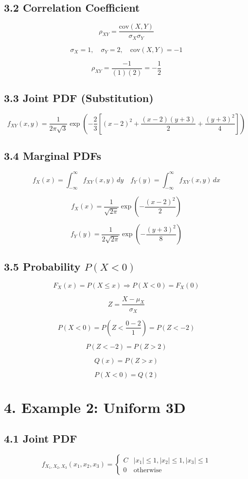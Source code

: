 \documentclass[12pt]{article}
\begin{document}
\subsection*{3.2 Correlation Coefficient}
\[
\rho_{XY} = \frac{\text{cov}(X,Y)}{\sigma_X \sigma_Y}
\]

\[
\sigma_X = 1, \quad \sigma_Y = 2, \quad \text{cov}(X,Y) = -1
\]

\[
\rho_{XY} = \frac{-1}{(1)(2)} = -\frac{1}{2}
\]

\subsection*{3.3 Joint PDF (Substitution)}
\[
f_{XY}(x,y)
=
\frac{1}{2\pi \sqrt{3}}
\exp\left(
-\frac{2}{3}
\left[
(x-2)^2 + \frac{(x-2)(y+3)}{2} + \frac{(y+3)^2}{4}
\right]
\right)
\]

\subsection*{3.4 Marginal PDFs}

\[
f_X(x) = \int_{-\infty}^{\infty} f_{XY}(x,y)\,dy
\quad
f_Y(y) = \int_{-\infty}^{\infty} f_{XY}(x,y)\,dx
\]

\[
f_X(x) = \frac{1}{\sqrt{2\pi}} \exp\left(-\frac{(x-2)^2}{2}\right)
\]

\[
f_Y(y) = \frac{1}{2\sqrt{2\pi}} \exp\left(-\frac{(y+3)^2}{8}\right)
\]

\subsection*{3.5 Probability $P(X<0)$}

\[
F_X(x) = P(X \le x)
\Rightarrow P(X<0) = F_X(0)
\]

\[
Z = \frac{X-\mu_X}{\sigma_X}
\]

\[
P(X<0) = P\left(Z < \frac{0-2}{1}\right) = P(Z < -2)
\]

\[
P(Z<-2) = P(Z>2)
\]

\[
Q(x) = P(Z>x)
\]

\[
P(X<0) = Q(2)
\]

\section*{4. Example 2: Uniform 3D}

\subsection*{4.1 Joint PDF}
\[
f_{X_1,X_2,X_3}(x_1,x_2,x_3)
=
\begin{cases}
C & |x_1|\le1, |x_2|\le1, |x_3|\le1 \\
0 & \text{otherwise}
\end{cases}
\]
\end{document}
